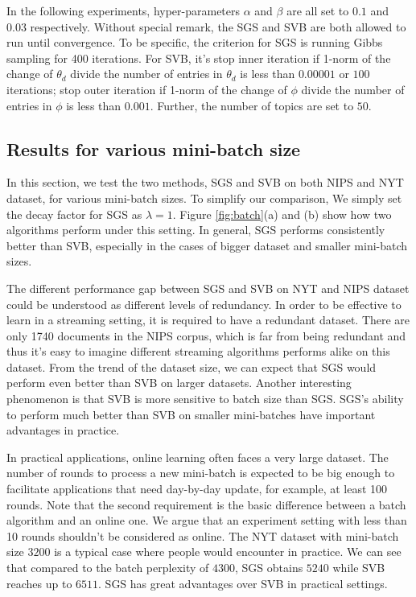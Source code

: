 \documentclass{article}
\begin{document}
\label{sec:exp_setting}
In the following experiments, hyper-parameters $\alpha$ and $\beta$ are all set to $0.1$ and $0.03$ respectively. Without special remark, the SGS and SVB are both allowed to run until convergence. To be specific, the criterion for SGS is running Gibbs sampling for 400 iterations. For SVB, it's stop inner iteration if 1-norm of the change of $\theta_d$ divide the number of entries in $\theta_d$ is less than $0.00001$ or $100$ iterations; stop outer iteration if 1-norm of the change of $\phi$ divide the number of entries in $\phi$ is less than $0.001$. Further, the number of topics are set to $50$. 
 
\subsection{Results for various mini-batch size}
In this section, we test the two methods, SGS and SVB on both NIPS and NYT dataset, for various mini-batch sizes. To simplify our comparison, We simply set the decay factor for SGS as $\lambda=1$. Figure \ref{fig:batch}(a) and (b) show how two algorithms perform under this setting. In general, SGS performs consistently better than SVB, especially in the cases of bigger dataset and smaller mini-batch sizes. 

The different performance gap between SGS and SVB on NYT and NIPS dataset could be understood as different levels of redundancy. In order to be effective to learn in a streaming setting, it is required to have a redundant dataset. There are only 1740 documents in the NIPS corpus, which is far from being redundant and thus it's easy to imagine different streaming algorithms performs alike on this dataset. From the trend of the dataset size, we can expect that SGS would perform even better than SVB on larger datasets. Another interesting phenomenon is that SVB is more sensitive to batch size than SGS. SGS's ability to perform much better than SVB on smaller mini-batches have important advantages in practice.

In practical applications, online learning often faces a very large dataset. The number of rounds to process a new mini-batch is expected to be big enough to facilitate applications that need day-by-day update, for example, at least 100 rounds. Note that the second requirement is the basic difference between a batch algorithm and an online one. We argue that an experiment setting with less than 10 rounds shouldn't be considered as online. The NYT dataset with mini-batch size $3200$ is a typical case where people would encounter in practice. We can see that compared to the batch perplexity of $4300$, SGS obtains $5240$ while SVB reaches up to $6511$. SGS has great advantages over SVB in practical settings.
\end{document}

